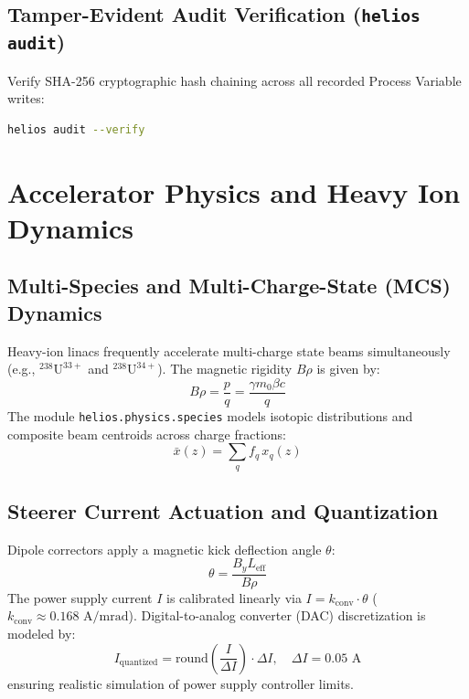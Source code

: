 \documentclass[11pt,a4paper]{report}
\begin{document}
\section{Tamper-Evident Audit Verification (\texttt{helios audit})}
Verify SHA-256 cryptographic hash chaining across all recorded Process Variable writes:
\begin{lstlisting}[language=bash]
helios audit --verify
\end{lstlisting}

\chapter{Accelerator Physics and Heavy Ion Dynamics}

\section{Multi-Species and Multi-Charge-State (MCS) Dynamics}
Heavy-ion linacs frequently accelerate multi-charge state beams simultaneously (e.g., $^{238}\text{U}^{33+}$ and $^{238}\text{U}^{34+}$). The magnetic rigidity $B\rho$ is given by:
\begin{equation}
    B\rho = \frac{p}{q} = \frac{\gamma m_0 \beta c}{q}
\end{equation}
The module \texttt{helios.physics.species} models isotopic distributions and composite beam centroids across charge fractions:
\begin{equation}
    \bar{x}(z) = \sum_{q} f_q \, x_q(z)
\end{equation}

\section{Steerer Current Actuation and Quantization}
Dipole correctors apply a magnetic kick deflection angle $\theta$:
\begin{equation}
    \theta = \frac{B_y L_{\text{eff}}}{B\rho}
\end{equation}
The power supply current $I$ is calibrated linearly via $I = k_{\text{conv}} \cdot \theta$ ($k_{\text{conv}} \approx 0.168\text{ A/mrad}$). Digital-to-analog converter (DAC) discretization is modeled by:
\begin{equation}
    I_{\text{quantized}} = \text{round}\left(\frac{I}{\Delta I}\right) \cdot \Delta I, \quad \Delta I = 0.05\text{ A}
\end{equation}
ensuring realistic simulation of power supply controller limits.
\end{document}

